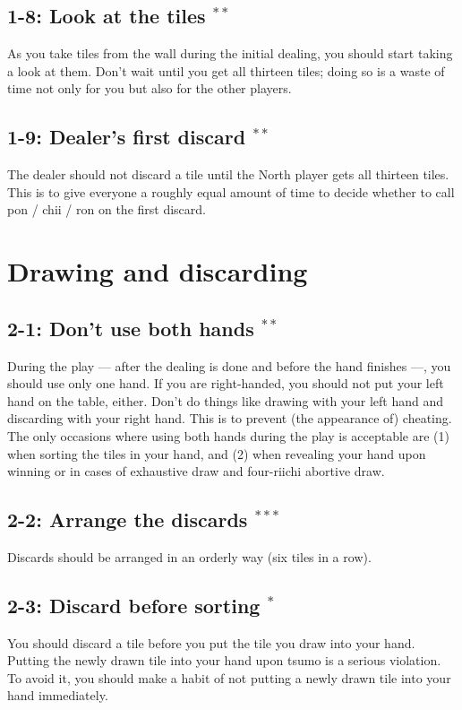 \subsection*{1-8: Look at the tiles $^{**}$}
As you take tiles from the wall during the initial dealing, you should start taking a look at them. Don't wait until you get all thirteen tiles; doing so is a waste of time not only for you but also for the other players. 

\subsection*{1-9: Dealer's first discard $^{**}$}
The dealer should not discard a tile until the North player gets all thirteen tiles. This is to give everyone a roughly equal amount of time to decide whether to call {\jap pon} / {\jap chii} / {\jap ron} on the first discard.

\section{Drawing and discarding}

\subsection*{2-1: Don't use both hands $^{**}$}
During the play --- after the dealing is done and before the hand finishes ---, you should use only one hand. If you are right-handed, you should not put your left hand on the table, either. Don't do things like drawing with your left hand and discarding with your right hand. This is to prevent (the appearance of) cheating. 
The only occasions where using both hands during the play is acceptable are (1) when sorting the tiles in your hand, and (2) when revealing your hand upon winning or in cases of exhaustive draw and four-riichi abortive draw. 

\subsection*{2-2: Arrange the discards $^{***}$}
Discards should be arranged in an orderly way (six tiles in a row). 

\subsection*{2-3: Discard before sorting $^{*}$}
You should discard a tile before you put the tile you draw into your hand. Putting the newly drawn tile into your hand upon {\jap tsumo} is a serious violation. To avoid it, you should make a habit of not putting a newly drawn tile into your hand immediately. 

